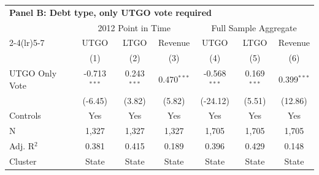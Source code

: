 \begingroup
\small
\centering
\begin{tabular*}{\textwidth}{@{\extracolsep{\fill}}lcccccc}
\multicolumn{7}{l}{\textbf{Panel B: Debt type, only UTGO vote required}}\\

\addlinespace
   \toprule
     & \multicolumn{3}{c}{2012 Point in Time} & \multicolumn{3}{c}{Full Sample Aggregate} \\ 
   \cmidrule(lr){2-4}\cmidrule(lr){5-7}
                  & UTGO           & LTGO          & Revenue       & UTGO           & LTGO          & Revenue \\   
                  & (1)            & (2)           & (3)           & (4)            & (5)           & (6)\\  
   \midrule 
   UTGO Only Vote & -0.713$^{***}$ & 0.243$^{***}$ & 0.470$^{***}$ & -0.568$^{***}$ & 0.169$^{***}$ & 0.399$^{***}$\\   
                  & (-6.45)       & (3.82)       & (5.82)       & (-24.12)      & (5.51)       & (12.86)\\   
   \hline
   Controls       & Yes & Yes & Yes & Yes & Yes & Yes\\
   N   & 1,327          & 1,327         & 1,327         & 1,705          & 1,705         & 1,705\\  
   Adj. R$^2$ & 0.381          & 0.415         & 0.189         & 0.396          & 0.429         & 0.148\\  
   Cluster              & State & State & State & State & State & State\\  
   \bottomrule
\end{tabular*}
\par\endgroup
